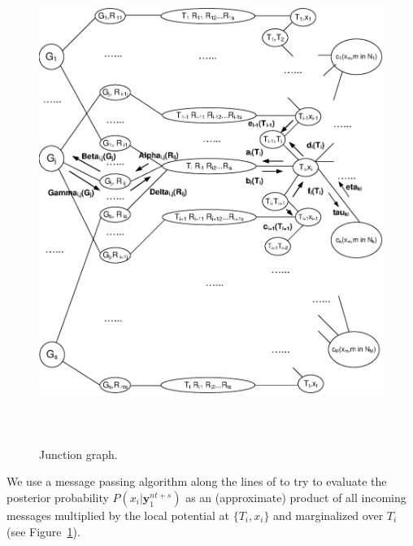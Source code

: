 {\begin{figure}\label{juncfig}
\vspace{0.0in}\hspace{0.0in}\includegraphics[width=5.0in,height=6.2in]{Drawing11new.eps}
\caption{Junction graph.}
\end{figure}




We use a message passing algorithm along the lines of \cite{aji} to
try to evaluate  the posterior probability
$P(x_i|\mathbf{y}_1^{nt+s})$ as an (approximate) product of all
incoming messages multiplied by the local potential at $\{T_i,x_i\}$
and marginalized over $T_i$ (see Figure~\ref{juncfig}).

}

